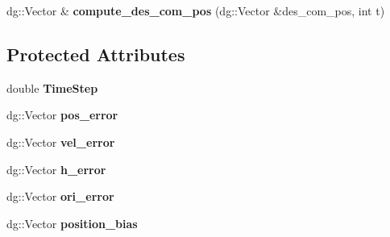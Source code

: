 \begin{DoxyCompactItemize}
\item 
dg\+::\+Vector \& {\bfseries compute\+\_\+des\+\_\+com\+\_\+pos} (dg\+::\+Vector \&des\+\_\+com\+\_\+pos, int t)\hypertarget{classdynamicgraph_1_1sot_1_1ComImpedanceControl_ab16f1f8744e0a844215b5c9a6e46ac32}{}\label{classdynamicgraph_1_1sot_1_1ComImpedanceControl_ab16f1f8744e0a844215b5c9a6e46ac32}

\end{DoxyCompactItemize}
\subsection*{Protected Attributes}
\begin{DoxyCompactItemize}
\item 
double {\bfseries Time\+Step}\hypertarget{classdynamicgraph_1_1sot_1_1ComImpedanceControl_a8da858067d374ebf6ae8273bfd2f68a9}{}\label{classdynamicgraph_1_1sot_1_1ComImpedanceControl_a8da858067d374ebf6ae8273bfd2f68a9}

\item 
dg\+::\+Vector {\bfseries pos\+\_\+error}\hypertarget{classdynamicgraph_1_1sot_1_1ComImpedanceControl_a2949f183f4d327cd276c970c6518a5d1}{}\label{classdynamicgraph_1_1sot_1_1ComImpedanceControl_a2949f183f4d327cd276c970c6518a5d1}

\item 
dg\+::\+Vector {\bfseries vel\+\_\+error}\hypertarget{classdynamicgraph_1_1sot_1_1ComImpedanceControl_a969ff175749f7fa941b113521ce21f16}{}\label{classdynamicgraph_1_1sot_1_1ComImpedanceControl_a969ff175749f7fa941b113521ce21f16}

\item 
dg\+::\+Vector {\bfseries h\+\_\+error}\hypertarget{classdynamicgraph_1_1sot_1_1ComImpedanceControl_a98f04f17826d362336933d88ee1e0a72}{}\label{classdynamicgraph_1_1sot_1_1ComImpedanceControl_a98f04f17826d362336933d88ee1e0a72}

\item 
dg\+::\+Vector {\bfseries ori\+\_\+error}\hypertarget{classdynamicgraph_1_1sot_1_1ComImpedanceControl_abe47c8c83c1d6da3ce4e41200f6a41d1}{}\label{classdynamicgraph_1_1sot_1_1ComImpedanceControl_abe47c8c83c1d6da3ce4e41200f6a41d1}

\item 
dg\+::\+Vector {\bfseries position\+\_\+bias}\hypertarget{classdynamicgraph_1_1sot_1_1ComImpedanceControl_ad860ad830c8182511376bce58a2d6f93}{}\label{classdynamicgraph_1_1sot_1_1ComImpedanceControl_ad860ad830c8182511376bce58a2d6f93}


\end{DoxyCompactItemize}
